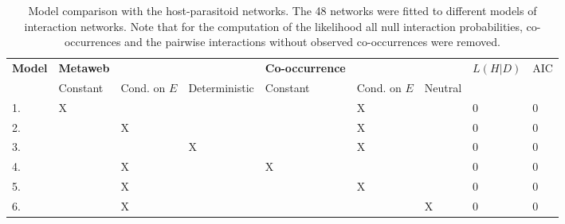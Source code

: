\documentclass[12pt]{article}
\begin{document}
\newpage


\begin{table}
	\centering
	\begin{tabular}{lllllllll}
	\hline
	\textbf{Model} & \textbf{Metaweb} & & & \textbf{Co-occurrence} & & & \textbf{$L(H|D)$} & AIC\\
	 & Constant & Cond. on $E$ & Deterministic & Constant & Cond. on $E$ & Neutral & & \\
	\hline
	1. & X & & &  & X & & 0 & 0 \\
	2. & & X & &  & X & & 0 & 0 \\
	3. & &  & X & & X & & 0 & 0 \\
	4. & & X & & X & & & 0 & 0 \\
	5. & & X & & & X & & 0 & 0 \\
	6. & & X & & & & X & 0 & 0 \\
	\hline
	\end{tabular}
	\caption{Model comparison with the host-parasitoid networks. The 48 networks were fitted to different models of interaction networks. Note that for the computation of the likelihood all null interaction probabilities, co-occurrences and the pairwise interactions without observed co-occurrences were removed.
}
\end{table}
\end{document}
